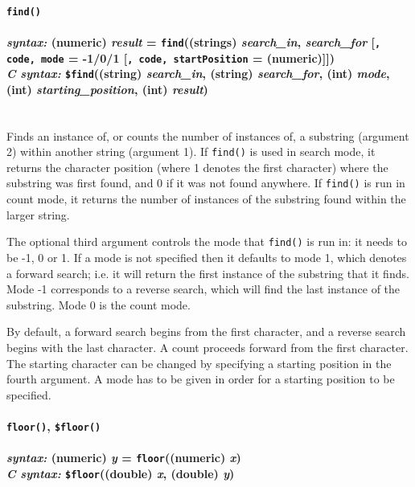 \documentclass{article}
\begin{document}
\paragraph{\texttt{find()}\\\\
\normalfont \emph{syntax: } (numeric) \emph{result} = \texttt{find}((strings) \emph{search\_in}, \emph{search\_for} [\texttt{, code, mode} = -1/0/1 [\texttt{, code, startPosition} = (numeric)]])\\
\normalfont \emph{C syntax: } \texttt{\$find}((string) \emph{search\_in}, (string) \emph{search\_for}, (int) \emph{mode}, (int) \emph{starting\_position}, (int) \emph{result})\\\\}

Finds an instance of, or counts the number of instances of, a substring (argument 2) within another string (argument 1).  If \texttt{find()} is used in search mode, it returns the character position (where 1 denotes the first character) where the substring was first found, and 0 if it was not found anywhere.  If \texttt{find()} is run in count mode, it returns the number of instances of the substring found within the larger string.

The optional third argument controls the mode that \texttt{find()} is run in:  it needs to be -1, 0 or 1.  If a mode is not specified then it defaults to mode 1, which denotes a forward search; i.e. it will return the first instance of the substring that it finds.  Mode -1 corresponds to a reverse search, which will find the last instance of the substring.  Mode 0 is the count mode.

By default, a forward search begins from the first character, and a reverse search begins with the last character.  A count proceeds forward from the first character.  The starting character can be changed by specifying a starting position in the fourth argument.  A mode has to be given in order for a starting position to be specified.\\






\paragraph{\texttt{floor()}, \texttt{\$floor()}\\\\
\normalfont \emph{syntax: } (numeric) \emph{y} = \texttt{floor}((numeric) \emph{x})\\
\normalfont \emph{C syntax: } \texttt{\$floor}((double) \emph{x}, (double) \emph{y})\\\\}
\end{document}
